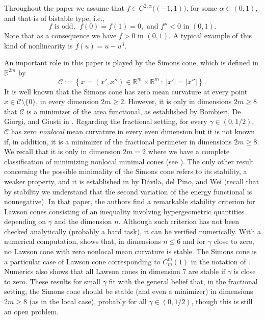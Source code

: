 \documentclass[12pt,reqno]{amsart}
\theoremstyle{definition}
\theoremstyle{remark}
\newcommand{\con}[1]{\mathbb{#1}}
\newcommand{\R}{\con{R}} %
\newcommand{\ccal}{\mathscr{C}}
\newcommand{\s}{\gamma}
\newcommand{\setcond}[2]{\left \{ #1 \ : \ #2  \right \}}
\numberwithin{equation}{section}
\begin{document}
Throughout the paper we assume that $f\in C^{2,\alpha}\big((-1,1)\big)$, for some $\alpha\in (0,1)$, and that is of bistable type, i.e.,
\begin{equation}\label{Eq:fHypotheses}
f \text{ is odd, }\; f(0)=f(1)=0,\text{ and }
f''<0 \text{ in } (0,1).
\end{equation}
Note that as a consequence we have $f>0$ in $(0,1)$. A typical example of this kind of nonlinearity is $f(u)=u-u^3$.

An important role in this paper is played by the Simons cone, which is defined in $\R^{2m}$ by
$$
\mathscr{C} := \setcond{x = (x', x'') \in \R^{m}\times \R^m}{|x'| = |x''|}\,.
$$
It is well known that the Simons cone has zero mean curvature at every point $x \in \ccal \setminus \{0\}$, in every dimension $2m \geq 2$. However, it is only in dimensions $2m \geq 8$ that $\ccal$ is a minimizer of the area functional, as established by Bombieri, De Giorgi, and Giusti in \cite{BombieriDeGiorgiGiusti}. Regarding the fractional setting, for every $\s\in(0,1/2)$, $\ccal$ has zero \emph{nonlocal} mean curvature in every even dimension but it is not known if, in addition,  it is a minimizer of the fractional perimeter in dimensions $2m\geq 8$. We recall that it is only in dimension $2m=2$ where we have a complete classification of minimizing nonlocal minimal cones (see \cite{SavinValdinoci-Cones}). The only other result concerning the possible minimality of the Simons cone refers to its stability, a weaker property, and it is established in \cite{DaviladelPinoWei} by Dávila, del Pino, and Wei (recall that by stability we understand that the second variation of the energy functional is nonnegative). In that paper, the authors find a remarkable stability criterion for Lawson cones consisting of an inequality involving hypergeometric quantities depending on $\s$ and the dimension $n$. Although such criterion has not been checked analytically (probably a hard task), it can be verified numerically. With a numerical computation, \cite{DaviladelPinoWei} shows that, in dimensions $n \leq 6$ and for $\s $ close to zero, no Lawson cone with zero nonlocal mean curvature is stable. The Simons cone is a particular case of Lawson cone corresponding to $C_m^m(1)$ in the notation of \cite{DaviladelPinoWei}. Numerics also shows that all Lawson cones in dimension $7$ are stable if $\s$ is close to zero. These results for small $\s$ fit with the general belief that, in the fractional setting, the Simons cone should be stable (and even a minimizer) in dimensions $2m \geq 8$ (as in the local case), probably for all $\s\in(0,1/2)$, though this is still an open problem. 
\end{document}
